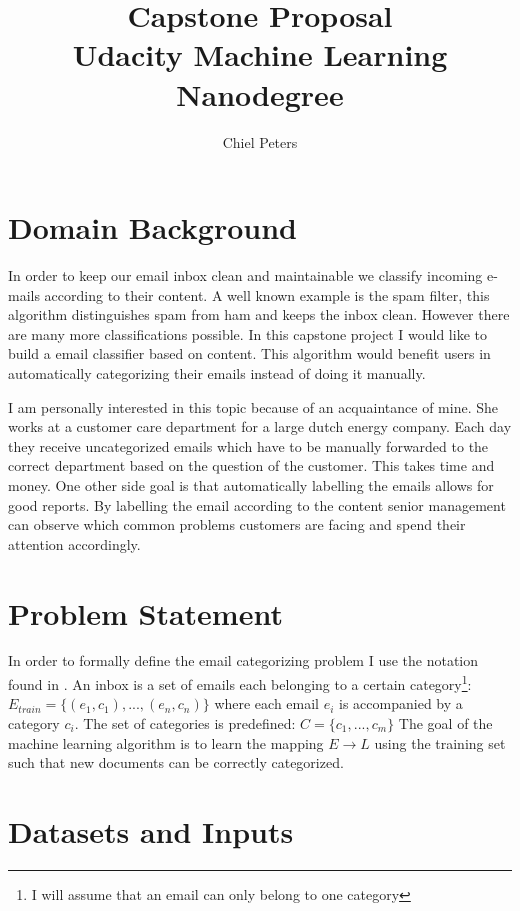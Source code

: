 \documentclass{article}
\begin{document}
\title{Capstone Proposal \\ Udacity Machine Learning Nanodegree}
\author{Chiel Peters}
\maketitle

\section*{Domain Background}

In order to keep our email inbox clean and maintainable we classify incoming e-mails according to their content. A well known example is the spam filter, this algorithm distinguishes spam from ham and keeps the inbox clean. However there are many more classifications possible. In this capstone project I would like to build a email classifier based on content. This algorithm would benefit users in automatically categorizing their emails instead of doing it manually.

I am personally interested in this topic because of an acquaintance of mine. She works at a customer care department for a large dutch energy company. Each day they receive uncategorized emails which have to be manually forwarded to the correct department based on the question of the customer. This takes time and money. One other side goal is that automatically labelling the emails allows for good reports. By labelling the email according to the content senior management can observe which common problems customers are facing and spend their attention accordingly.
 
\section*{Problem Statement}

In order to formally define the email categorizing problem I use the notation found in \cite{bekkerman2004ace}. An inbox is a set of emails each belonging to a certain category\footnote{I will assume that an email can only belong to one category}: $E_{train} = \{(e_1,c_1),...,(e_n,c_n)\}$ where each email $e_i$ is accompanied by a category $c_i$. The set of categories is predefined: $C = \{c_1,...,c_m\}$ The goal of the machine learning algorithm is to learn the mapping $ E \rightarrow L$ using the training set such that new documents can be correctly categorized.

\section*{Datasets and Inputs}
\end{document}

